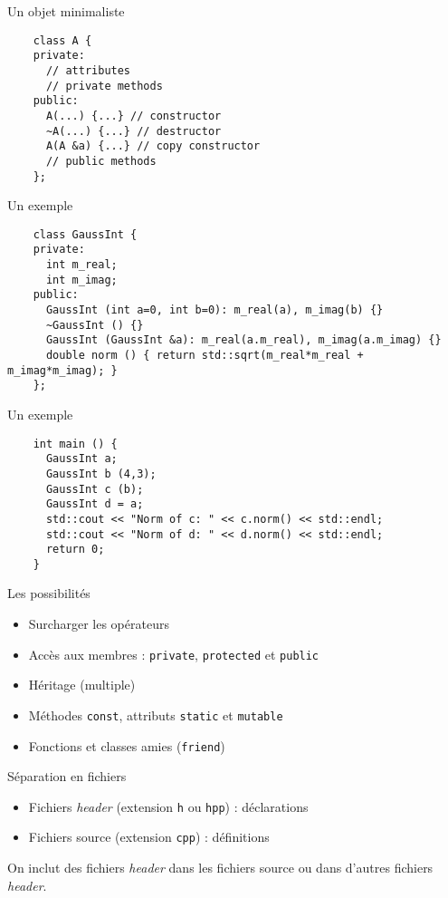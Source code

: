 \begin{frame}[fragile]{Un objet minimaliste}
  \begin{lstlisting}
    class A {
    private:
      // attributes
      // private methods
    public:
      A(...) {...} // constructor
      ~A(...) {...} // destructor
      A(A &a) {...} // copy constructor
      // public methods
    };
  \end{lstlisting}
\end{frame}

\begin{frame}[fragile]{Un exemple}
  \begin{lstlisting}
    class GaussInt {
    private:
      int m_real;
      int m_imag;
    public:
      GaussInt (int a=0, int b=0): m_real(a), m_imag(b) {}
      ~GaussInt () {}
      GaussInt (GaussInt &a): m_real(a.m_real), m_imag(a.m_imag) {}
      double norm () { return std::sqrt(m_real*m_real + m_imag*m_imag); }
    };
  \end{lstlisting}
\end{frame}

\begin{frame}[fragile]{Un exemple}
  \begin{lstlisting}
    int main () {
      GaussInt a;
      GaussInt b (4,3);
      GaussInt c (b);
      GaussInt d = a;
      std::cout << "Norm of c: " << c.norm() << std::endl;
      std::cout << "Norm of d: " << d.norm() << std::endl;
      return 0;
    }
  \end{lstlisting}
\end{frame}

\begin{frame}{Les possibilités}
  \begin{itemize}
  \item Surcharger les opérateurs
  \item Accès aux membres : \texttt{private}, \texttt{protected} et \texttt{public}
  \item Héritage (multiple)
  \item Méthodes \texttt{const}, attributs \texttt{static} et \texttt{mutable}
  \item Fonctions et classes amies (\texttt{friend})
  \end{itemize}
\end{frame}

\begin{frame}{Séparation en fichiers}
  \begin{itemize}
  \item Fichiers \textit{header} (extension \texttt{h} ou \texttt{hpp}) : déclarations
  \item Fichiers source (extension \texttt{cpp}) : définitions
  \end{itemize}

  On inclut des fichiers \textit{header} dans les fichiers source ou dans d'autres fichiers \textit{header}.
\end{frame}

